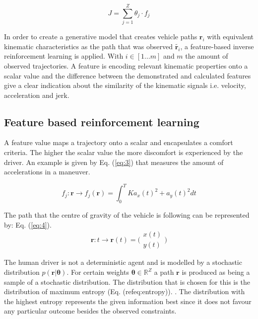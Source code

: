 \begin{equation}\label{eq:1}
	J = \sum_{j=1}^{Z}\theta_j\cdot f_j	
\end{equation}


In order to create a generative model that creates vehicle paths $\bm{r}_i$ with equivalent kinematic characteristics as the path that was observed $\tilde{\bm{r}_i}$, a feature-based inverse reinforcement learning is applied. \cite{Kuderer2015a,Abbeel2004} With $i \in [1 ... m]$ and $m$ the amount of observed trajectories. A feature is encoding relevant kinematic properties onto a scalar value and the difference between the demonstrated and calculated features give a clear indication about the similarity of the kinematic signals i.e. velocity, acceleration and jerk. \\

\subsection{Feature based reinforcement learning}
A feature value maps a trajectory onto a scalar and encapsulates a comfort criteria. The higher the scalar value the more discomfort is experienced by the driver. An example is given by Eq. (\ref{eq:3}) that measures the amount of accelerations in a maneuver.

\begin{equation}\label{eq:3}
f_j:\bm{r}\xrightarrow{}f_j(\bm{r})=\int_{0}^{T}Ka_x(t)^{2}+a_y(t)^{2} dt
\end{equation}

The path that the centre of gravity of the vehicle is following can be represented by: Eq. (\ref{eq:4}).
\begin{equation}\label{eq:4}
\bm{r}:t \xrightarrow{}\bm{r}(t) =  \bigl( \begin{smallmatrix} x(t)\\ y(t) \end{smallmatrix}\bigr)
\end{equation}

The human driver is not a deterministic agent and is modelled by a stochastic distribution $p(\bm{r}|\bm{\theta})$. For certain weights $\bm{\theta} \in \mathbb{R}^Z$ a path $\bm{r}$ is produced as being a sample of a stochastic distribution. The distribution that is chosen for this is the distribution of maximum entropy (Eq. (ref{eq:entropy})). \cite{Ziebart2008, Kretzschmar2014}. 
The distribution with the highest entropy represents the given information best since it does not favour any particular outcome besides the observed constraints. \cite{Abbeel2004}
	
